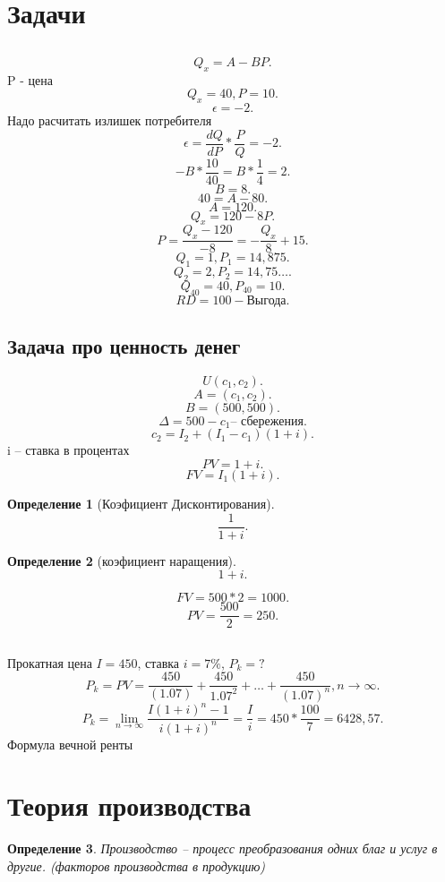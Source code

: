 \documentclass[14pt]{extarticle}
\newtheorem{definition}{Определение}
\begin{document}
\section{Задачи}
\subsection{}
\[
	Q_{x} = A - BP
	.\]
P - цена\\
\[
	Q_{x} = 40,  P = 10
	.\]
\[
	\epsilon = -2
	.\]
Надо расчитать излишек потребителя
\[
	\epsilon = \frac{d Q}{d P} * \frac{P}{Q} = -2
	.\]
\[
	-B  * \frac{10}{40} =  B * \frac{1}{4} = 2
	.\]
\[
	B = 8
	.\]
\[
	40 = A - 80
	.\]
\[
	A = 120
	.\]
\[
	Q_{x} =120 -8P
	.\]
\[
	P = \frac{Q_{x} - 120}{-8} = - \frac{Q_{x}}{8} + 15
	.\]
\[
	Q_1 = 1, P_1 = 14,875
	.\]
\[
	Q_2 = 2 , P_2 = 14,75\dots
	.\]
\[
	Q_{40} = 40, P_{40} = 10
	.\]
\[
	RD = 100 - \text{Выгода}
	.\]
\subsection{Задача про ценность денег}
\[
	U(c_1,c_2)
	.\]
\[
	A = (c_1,c_2)
	.\]
\[
	B = (500,500)
	.\]
\[
	\varDelta = 500 - c_1 \text{-- сбережения}
	.\]
\[
	c_2 = I_2 + (I_1 - c_1) (1 + i)
	.\]
i -- ставка в процентах
\[
	PV = 1 + i
	.\]
\[
	FV =  I_1 (1 + i)
	.\]
\begin{definition}[Коэфициент Дисконтирования]
	\[
		\frac{1}{1 + i}
		.\]
\end{definition}
\begin{definition}[коэфициент наращения]
	\[
		1 + i
		.\]
\end{definition}
\[
	FV = 500 * 2 = 1000
	.\]
\[
	PV = \frac{500}{2} = 250
	.\]
\subsection{}
Прокатная цена $I = 450$, ставка  $i = 7\%$,  $P_{k} = ?$
\[
	P_{k} = PV = \frac{450}{(1.07)} + \frac{450}{1.07^2} + \dots + \frac{450}{(1.07)^{n}}, n\to \infty
	.\]
\[
	P_{k} =\lim_{n \to \infty} \frac{I  (1 + i)^{n} - 1}{i(1 + i)^n} = \frac{I}{i} = 450 * \frac{100}{7} = 6428,57
	.\]
Формула вечной ренты
\section{Теория производства}
\begin{definition}
	Производство -- процесс преобразования одних благ и услуг в другие. (факторов производства в продукцию)
\end{definition}
\end{document}
